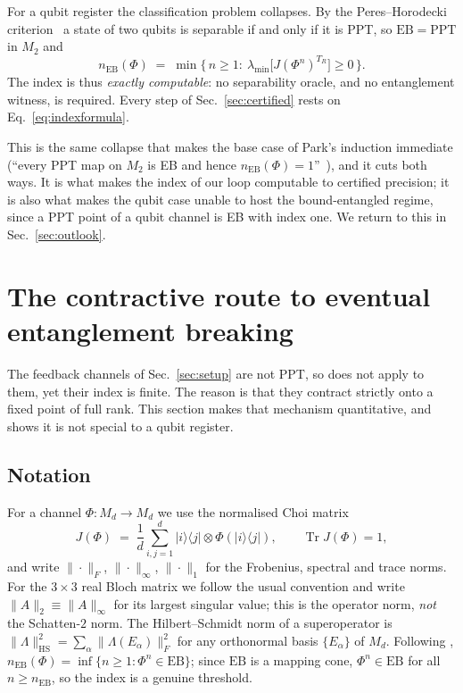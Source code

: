 \documentclass[11pt,a4paper]{article}
\theoremstyle{definition}
\theoremstyle{remark}
\newcommand{\nEB}{n_{\mathrm{EB}}}
\newcommand{\EB}{\mathrm{EB}}
\newcommand{\PPT}{\mathrm{PPT}}
\providecommand{\ket}[1]{|#1\rangle}
\providecommand{\bra}[1]{\langle#1|}
\begin{document}
For a qubit register the classification problem collapses. By the
Peres--Horodecki criterion~\cite{Peres96,Horodecki96} a state of two qubits is
separable if and only if it is PPT, so $\EB=\PPT$ in $M_{2}$ and
\begin{equation}\label{eq:indexformula}
  \nEB(\Phi)\;=\;\min\bigl\{\,n\ge1:\ \lambda_{\min}\bigl[J(\Phi^{n})^{T_{R}}\bigr]\ge0\,\bigr\}.
\end{equation}
The index is thus \emph{exactly computable}: no separability oracle, and no
entanglement witness, is required. Every step of
Sec.~\ref{sec:certified} rests on Eq.~\eqref{eq:indexformula}.

This is the same collapse that makes the base case of Park's induction
immediate (``every PPT map on $M_{2}$ is EB and hence
$\nEB(\Phi)=1$''~\cite{Park2026}), and it cuts both ways. It is what makes the
index of our loop computable to certified precision; it is also what makes the
qubit case unable to host the bound-entangled regime, since a PPT point of a
qubit channel is EB with index one. We return to this in Sec.~\ref{sec:outlook}.

\section{The contractive route to eventual entanglement breaking}
\label{sec:contractive}

The feedback channels of Sec.~\ref{sec:setup} are not PPT, so
\cite[Thm.~1.1]{Park2026} does not apply to them, yet their index is finite. The
reason is that they contract strictly onto a fixed point of full rank. This
section makes that mechanism quantitative, and shows it is not special to a
qubit register.

\subsection{Notation}

For a channel $\Phi:M_d\to M_d$ we use the normalised Choi matrix
\begin{equation}
  J(\Phi) \;=\; \frac1d\sum_{i,j=1}^{d}\ket{i}\bra{j}\otimes\Phi(\ket{i}\bra{j}),
  \qquad \operatorname{Tr}J(\Phi)=1 ,
\end{equation}
and write $\|\cdot\|_F$, $\|\cdot\|_\infty$, $\|\cdot\|_1$ for the Frobenius,
spectral and trace norms. For the $3\times3$ real Bloch matrix we follow the
usual convention and write $\|A\|_2\equiv\|A\|_\infty$ for its largest singular
value; this is the operator norm, \emph{not} the Schatten-$2$ norm. The Hilbert--Schmidt norm of a superoperator is
$\|\Lambda\|_{\mathrm{HS}}^2=\sum_{\alpha}\|\Lambda(E_\alpha)\|_F^2$ for any
orthonormal basis $\{E_\alpha\}$ of $M_d$. Following \cite{LG2015,Park2026},
$n_{\mathrm{EB}}(\Phi)=\inf\{n\ge1:\Phi^n\in\mathrm{EB}\}$; since $\mathrm{EB}$
is a mapping cone, $\Phi^{n}\in\mathrm{EB}$ for all $n\ge n_{\mathrm{EB}}$, so
the index is a genuine threshold.
\end{document}
